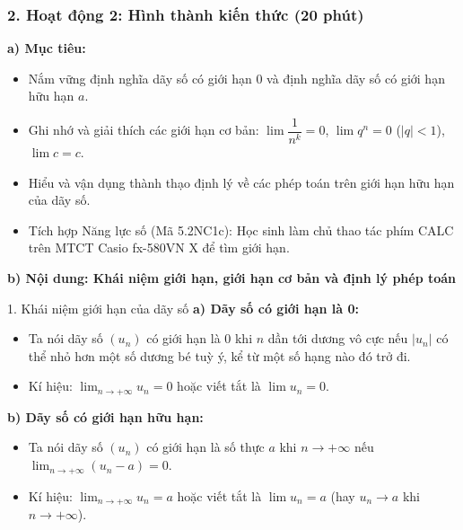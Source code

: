 \documentclass[12pt, a4paper]{article}
\begin{document}
\subsubsection*{2. Hoạt động 2: Hình thành kiến thức (20 phút)}

\noindent \textbf{a) Mục tiêu:}
\begin{itemize}[leftmargin=0.6cm]
    \item Nắm vững định nghĩa dãy số có giới hạn $0$ và định nghĩa dãy số có giới hạn hữu hạn $a$.
    \item Ghi nhớ và giải thích các giới hạn cơ bản: $\lim \dfrac{1}{n^k} = 0$, $\lim q^n = 0$ ($|q| < 1$), $\lim c = c$.
    \item Hiểu và vận dụng thành thạo định lý về các phép toán trên giới hạn hữu hạn của dãy số.
    \item Tích hợp Năng lực số (Mã 5.2NC1c): Học sinh làm chủ thao tác phím CALC trên MTCT Casio fx-580VN X để tìm giới hạn.
\end{itemize}

\noindent \textbf{b) Nội dung: Khái niệm giới hạn, giới hạn cơ bản và định lý phép toán}

\begin{pedabox}{1. Khái niệm giới hạn của dãy số}
\textbf{a) Dãy số có giới hạn là 0:}
\begin{itemize}[leftmargin=0.6cm]
    \item Ta nói dãy số $(u_n)$ có giới hạn là $0$ khi $n$ dần tới dương vô cực nếu $|u_n|$ có thể nhỏ hơn một số dương bé tuỳ ý, kể từ một số hạng nào đó trở đi.
    \item Kí hiệu: $\lim_{n \to +\infty} u_n = 0$ hoặc viết tắt là $\lim u_n = 0$.
\end{itemize}

\textbf{b) Dãy số có giới hạn hữu hạn:}
\begin{itemize}[leftmargin=0.6cm]
    \item Ta nói dãy số $(u_n)$ có giới hạn là số thực $a$ khi $n \to +\infty$ nếu $\lim_{n \to +\infty} (u_n - a) = 0$.
    \item Kí hiệu: $\lim_{n \to +\infty} u_n = a$ hoặc viết tắt là $\lim u_n = a$ (hay $u_n \to a$ khi $n \to +\infty$).
\end{itemize}
\end{pedabox}
\end{document}
